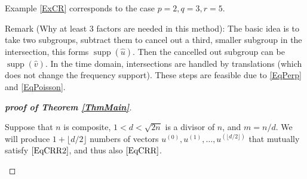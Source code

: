 \documentclass[A4,11pt]{article}
\DeclareMathOperator{\supp}{supp}
\begin{document}
Example \ref{ExCR} corresponds to the case $p=2, q=3, r=5$.

Remark (Why at least $3$ factors are needed in this method): The basic idea is to take two subgroups, subtract them to cancel out a third, smaller subgroup in the intersection, this forms $\supp(\hat u)$. Then the cancelled out subgroup can be $\supp(\hat v)$. In the time domain, intersections are handled by translations (which does not change the frequency support). These steps are feasible due to \eqref{EqPerp} and \eqref{EqPoisson}.

\begin{proof}[\textbf{proof of Theorem \ref{ThmMain}}]
\begin{description}[leftmargin=*]
\item[The if part:] Suppose that $n$ is composite, $1<d<\sqrt{2n}$ is a divisor of $n$, and $m=n/d$. We will produce $1+\lfloor d/2\rfloor$ numbers of vectors $u^{(0)},  u^{(1)}, \ldots, u^{(\lfloor d/2\rfloor)}$ that mutually satisfy $\eqref{EqCRR2}$, and thus also $\eqref{EqCRR}$.


\end{description}
\end{proof}
\end{document}
